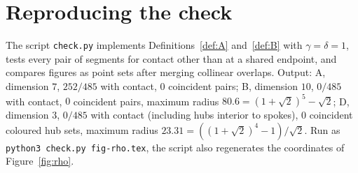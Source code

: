 \documentclass[11pt]{article}
\theoremstyle{definition}
\theoremstyle{remark}
\begin{document}
\appendix
\section{Reproducing the check}
The script \texttt{check.py} implements Definitions~\ref{def:A} and~\ref{def:B}
with $\gamma=\delta=1$, tests every pair of segments for contact other than at a
shared endpoint, and compares figures as point sets after merging collinear
overlaps. Output: A, dimension $7$, $252/485$ with contact, $0$ coincident pairs;
B, dimension $10$, $0/485$ with contact, $0$ coincident pairs, maximum radius
$80.6=(1+\sqrt2)^5-\sqrt2$; D, dimension $3$, $0/485$ with contact (including
hubs interior to spokes), $0$ coincident coloured hub sets, maximum radius
$23.31=((1+\sqrt2)^4-1)/\sqrt2$. Run as \texttt{python3 check.py fig-rho.tex},
the script also regenerates the coordinates of Figure~\ref{fig:rho}.
\end{document}
